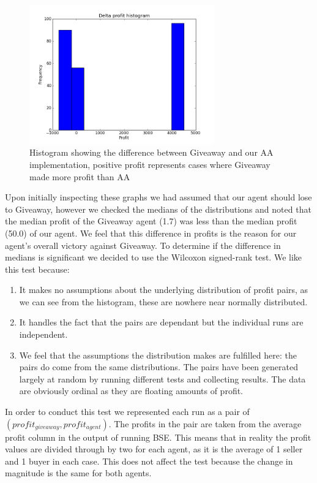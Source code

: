 \documentclass{acm_proc_article-sp}
\begin{document}
\begin{figure}[h!] \includegraphics[width=80mm]{giveaway_1_v_1_delta.png}
\caption {Histogram showing the difference between Giveaway and our AA implementation,
positive profit represents cases where Giveaway made more profit than AA}
\end{figure}

\newpage
Upon initially inspecting these graphs we had assumed that our agent should
lose to Giveaway, however we checked the medians of the distributions and noted
that the median profit of the Giveaway agent (1.7) was less than the median
profit (50.0) of our agent. We feel that this difference in profits is the
reason for our agent's overall victory against Giveaway. To determine if the
difference in medians is significant we decided to use the Wilcoxon signed-rank
test\cite{wiki:wilcoxon}. We like this test because:

\begin{enumerate}
\item It makes no assumptions about the underlying
distribution of profit pairs, as we can see from the histogram, these are
nowhere near normally distributed.

\item It handles the fact that the pairs are dependant but the individual runs
are independent.

\item We feel that the assumptions the distribution makes are fulfilled here:
the pairs do come from the same distributions. The pairs have been generated
largely at random by running different tests and collecting results. The data
are obviously ordinal as they are floating amounts of profit.

\end{enumerate}

In order to conduct this test we represented each run as a pair of
$(profit_{giveaway}, profit_{agent})$. The profits in the pair are taken from
the average profit column in the output of running BSE. This means that in
reality the profit values are divided through by two for each agent, as it is
the average of 1 seller and 1 buyer in each case. This does not affect the test
because the change in magnitude is the same for both agents.
\end{document}
